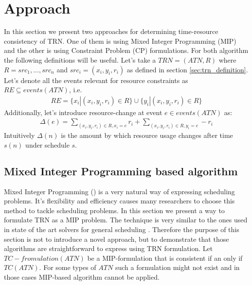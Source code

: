 \section{Approach}
In this section we present two approaches for determining time-resource consistency of TRN. One of them is using Mixed Integer Programming (MIP) and the other is using Constraint Problem (CP) formulations. For both algorithm the following definitions will be useful.
Let's take a $TRN=(ATN, R)$ where $R={src_1, ..., src_n}$ and $src_i = (x_i, y_i, r_i)$ as defined in section \ref{sec:trn_definition}. Let's denote all the events relevant for resource constraints as $RE \subseteq events(ATN)$, i.e.
\begin{align*}
RE = \{ x_i | (x_i, y_i, r_i) \in R \} \cup \{ y_i | (x_i, y_i, r_i) \in R \}
\end{align*}
Additionally, let's introduce resource-change at event $e \in events(ATN)$ as:
\begin{align*}
\Delta(e) = \sum_{(x_i, y_i, r_i) \in R, x_i = e} r_i + \sum_{(x_i, y_i, r_i) \in R, y_i = e} -r_i
\end{align*}
Intuitively $\Delta(n)$ is the amount by which resource usage changes after time $s(n)$ under schedule $s$.

\subsection{Mixed Integer Programming based algorithm}
Mixed Integer Programming (\cite{markowitz1957solution}) is a very natural way of expressing scheduling problems. It's flexibility and efficiency causes many researchers to choose this method to tackle scheduling problems. In this section we present a way to formulate TRN as a MIP problem. The technique is very similar to the ones used in state of the art solvers for general scheduling  \cite{patterson1984comparison} \cite{bartusch1988scheduling}. Therefore the purpose of this section is not to introduce a novel approach, but to demonstrate that those algorithms are straightforward to express using TRN formulation. Let $TC-fromulation(ATN)$ be a MIP-formulation that is consistent if an only if $TC(ATN)$. For some types of $ATN$ such a formulation might not exist and in those cases MIP-based algorithm cannot be applied.

